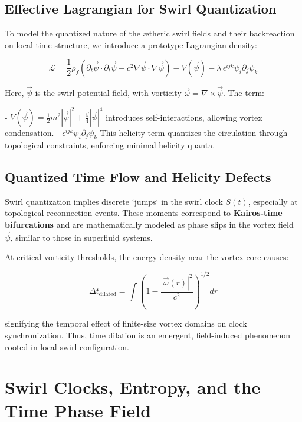 \documentclass[a4paper,12pt]{article}
\begin{document}
\subsection{Effective Lagrangian for Swirl Quantization}

To model the quantized nature of the ætheric swirl fields and their backreaction on local time structure, we introduce a prototype Lagrangian density:

\[
    \mathcal{L} = \frac{1}{2} \rho_{\scriptscriptstyle\boldsymbol\!f} \left( \partial_t \vec{\psi} \cdot \partial_t \vec{\psi} - c^2 \nabla \vec{\psi} \cdot \nabla \vec{\psi} \right) - V(\vec{\psi}) - \lambda \, \epsilon^{ijk} \psi_i \partial_j \psi_k
\]

Here, \( \vec{\psi} \) is the swirl potential field, with vorticity \( \vec{\omega} = \nabla \times \vec{\psi} \). The term:

- \( V(\vec{\psi}) = \frac{1}{2} m^2 |\vec{\psi}|^2 + \frac{\beta}{4} |\vec{\psi}|^4 \) introduces self-interactions, allowing vortex condensation.
- \( \epsilon^{ijk} \psi_i \partial_j \psi_k \) This helicity term quantizes the circulation through topological constraints, enforcing minimal helicity quanta.

\subsection{Quantized Time Flow and Helicity Defects}

Swirl quantization implies discrete `jumps` in the swirl clock \( S(t) \), especially at topological reconnection events. These moments correspond to \textbf{Kairos-time bifurcations} and are mathematically modeled as phase slips in the vortex field \( \vec{\psi} \), similar to those in superfluid systems.

At critical vorticity thresholds, the energy density near the vortex core causes:

\[
    \Delta t_{\text{dilated}} = \int \left( 1 - \frac{|\vec{\omega}(r)|^2}{c^2} \right)^{1/2} dr
\]

signifying the temporal effect of finite-size vortex domains on clock synchronization. Thus, time dilation is an emergent, field-induced phenomenon rooted in local swirl configuration.


    \section{Swirl Clocks, Entropy, and the Time Phase Field}
\end{document}

